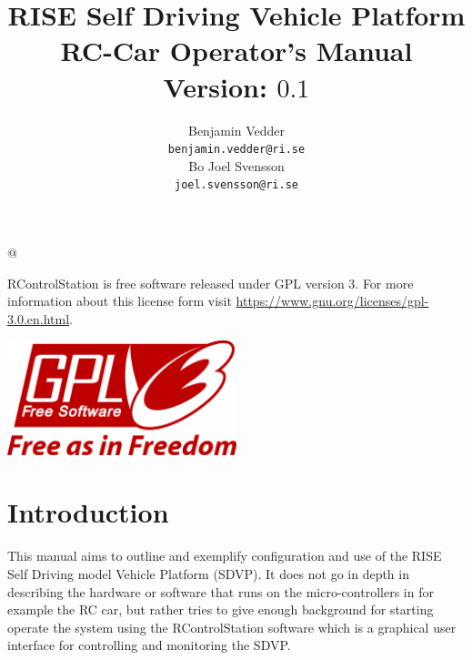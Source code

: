 \documentclass[12pt]{article} %
\makeatletter
\renewcommand{\maketitle}{\bgroup\setlength{\parindent}{0pt}
  \thispagestyle{empty}
  \begin{flushleft}
    \textbf{\@title}

    \vspace{3cm}
    
    \@author
    
    \begin{center}
    \end{center}
      
  \end{flushleft}\egroup
}
\newcommand{\GUIDEVERSION}[0]{$0.1$}
\newcommand{\GUIDETITLE}[0]{RISE Self Driving Vehicle Platform \newline \noindent
  RC-Car Operator's Manual \newline \noindent Version: \GUIDEVERSION{}}
\makeatother
\begin{document}
\title{\GUIDETITLE}


\author{Benjamin Vedder\\ \texttt{benjamin.vedder@ri.se}\\ \vspace{5mm} Bo Joel Svensson\\ \texttt{joel.svensson@ri.se}} 

\lstMakeShortInline[]@

\maketitle


\newpage
\noindent RControlStation is free software released under GPL version 3. For more information about this license form visit \url{https://www.gnu.org/licenses/gpl-3.0.en.html}.

\vspace{5mm}

\noindent\includegraphics[width=0.5\textwidth]{./pictures/gplv3.pdf}

\newpage
\tableofcontents{}
\newpage


\section{Introduction}

This manual aims to outline and exemplify configuration and use of the
RISE Self Driving model Vehicle Platform (SDVP). It does not go in
depth in describing the hardware or software that runs on the
micro-controllers in for example the RC car, but rather tries to give
enough background for starting operate the system using the
RControlStation software which is a graphical user interface for
controlling and monitoring the SDVP.
\end{document}
